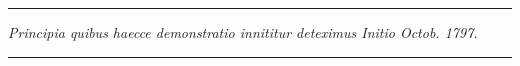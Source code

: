 \documentclass[14pt]{memoir}
\theoremstyle{plain}
\theoremstyle{remark}
\begin{document}
\begin{center}

 \rule{3in}{0.5pt}

\begin{scriptsize}\textit{Principia quibus haecce demonstratio innititur deteximus Initio Octob. 1797.}\end{scriptsize}

 \rule{2in}{0.5pt}

\end{center}
\end{document}
